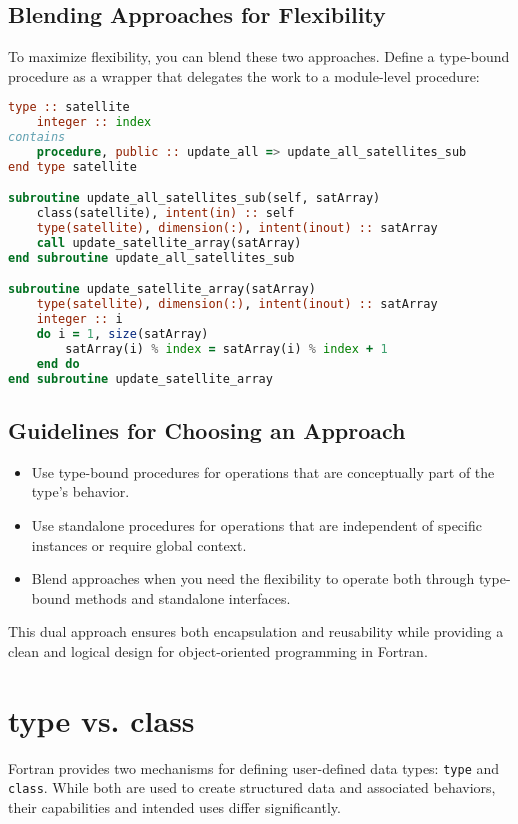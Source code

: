 \subsection{Blending Approaches for Flexibility}

To maximize flexibility, you can blend these two approaches. Define a type-bound procedure as a wrapper that delegates the work to a module-level procedure:
\begin{lstlisting}[language=Fortran]
type :: satellite
    integer :: index
contains
    procedure, public :: update_all => update_all_satellites_sub
end type satellite

subroutine update_all_satellites_sub(self, satArray)
    class(satellite), intent(in) :: self
    type(satellite), dimension(:), intent(inout) :: satArray
    call update_satellite_array(satArray)
end subroutine update_all_satellites_sub

subroutine update_satellite_array(satArray)
    type(satellite), dimension(:), intent(inout) :: satArray
    integer :: i
    do i = 1, size(satArray)
        satArray(i) % index = satArray(i) % index + 1
    end do
end subroutine update_satellite_array
\end{lstlisting}

\subsection{Guidelines for Choosing an Approach}

\begin{itemize}
    \item Use type-bound procedures for operations that are conceptually part of the type’s behavior.
    \item Use standalone procedures for operations that are independent of specific instances or require global context.
    \item Blend approaches when you need the flexibility to operate both through type-bound methods and standalone interfaces.
\end{itemize}

This dual approach ensures both encapsulation and reusability while providing a clean and logical design for object-oriented programming in Fortran.


\section{type vs. class}

Fortran provides two mechanisms for defining user-defined data types: \texttt{type} and \texttt{class}. While both are used to create structured data and associated behaviors, their capabilities and intended uses differ significantly.

